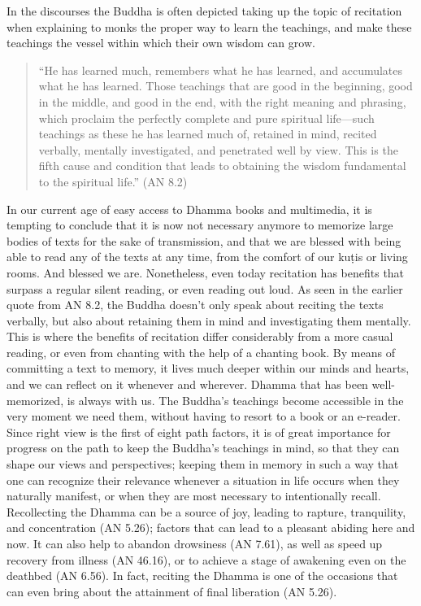 In the discourses the Buddha is often depicted taking up the topic of recitation when explaining to monks the proper way to learn the teachings, and make these teachings the vessel within which their own wisdom can grow.\\

\begin{quote}
  ``He has learned much, remembers what he has learned, and accumulates what he has learned. Those teachings that are good in the beginning, good in the middle, and good in the end, with the right meaning and phrasing, which proclaim the perfectly complete and pure spiritual life—such teachings as these he has learned much of, retained in mind, recited verbally, mentally investigated, and penetrated well by view. This is the fifth cause and condition that leads to obtaining the wisdom fundamental to the spiritual life.'' (AN 8.2)\\
\end{quote}

In our current age of easy access to Dhamma books and multimedia, it is tempting to conclude that it is now not necessary anymore to memorize large bodies of texts for the sake of transmission, and that we are blessed with being able to read any of the texts at any time, from the comfort of our kuṭis or living rooms. And blessed we are. Nonetheless, even today recitation has benefits that surpass a regular silent reading, or even reading out loud. As seen in the earlier quote from AN 8.2, the Buddha doesn't only speak about reciting the texts verbally, but also about retaining them in mind and investigating them mentally. This is where the benefits of recitation differ considerably from a more casual reading, or even from chanting with the help of a chanting book. By means of committing a text to memory, it lives much deeper within our minds and hearts, and we can reflect on it whenever and wherever. Dhamma that has been well-memorized, is always with us. The Buddha's teachings become accessible in the very moment we need them, without having to resort to a book or an e-reader.\\

Since right view is the first of eight path factors, it is of great importance for progress on the path to keep the Buddha's teachings in mind, so that they can shape our views and perspectives; keeping them in memory in such a way that one can recognize their relevance whenever a situation in life occurs when they naturally manifest, or when they are most necessary to intentionally recall. Recollecting the Dhamma can be a source of joy, leading to rapture, tranquility, and concentration (AN 5.26); factors that can lead to a pleasant abiding here and now. It can also help to abandon drowsiness (AN 7.61), as well as speed up recovery from illness (AN 46.16), or to achieve a stage of awakening even on the deathbed (AN 6.56). In fact, reciting the Dhamma is one of the occasions that can even bring about the attainment of final liberation (AN 5.26).\\


